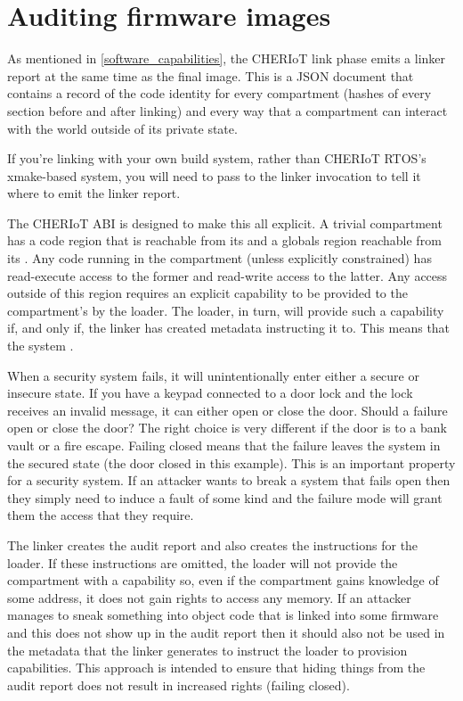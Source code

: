 \chapter[label="cheriot-audit"]{Auditing firmware images}

As mentioned in \ref{software_capabilities}, the CHERIoT link phase emits a linker report at the same time as the final image.
This is a JSON document that contains a record of the code identity for every compartment (hashes of every section before and after linking) and every way that a compartment can interact with the world outside of its private state.

\begin{note}
	If you're linking with your own build system, rather than CHERIoT RTOS's xmake-based system, you will need to pass  to the linker invocation to tell it where to emit the linker report.
\end{note}

The CHERIoT ABI is designed to make this all explicit.
A trivial compartment has a code region that is reachable from its  and a globals region reachable from its .
Any code running in the compartment (unless explicitly constrained) has read-execute access to the former and read-write access to the latter.
Any access outside of this region requires an explicit capability to be provided to the compartment's  by the loader.
The loader, in turn, will provide such a capability if, and only if, the linker has created metadata instructing it to.
This means that the system .

When a security system fails, it will unintentionally enter either a secure or insecure state.
If you have a keypad connected to a door lock and the lock receives an invalid message, it can either open or close the door.
Should a failure open or close the door?
The right choice is very different if the door is to a bank vault or a fire escape.
Failing closed means that the failure leaves the system in the secured state (the door closed in this example).
This is an important property for a security system.
If an attacker wants to break a system that fails open then they simply need to induce a fault of some kind and the failure mode will grant them the access that they require.

The linker creates the audit report and also creates the instructions for the loader.
If these instructions are omitted, the loader will not provide the compartment with a capability so, even if the compartment gains knowledge of some address, it does not gain rights to access any memory.
If an attacker manages to sneak something into object code that is linked into some firmware and this does not show up in the audit report then it should also not be used in the metadata that the linker generates to instruct the loader to provision capabilities.
This approach is intended to ensure that hiding things from the audit report does not result in increased rights (failing closed).

